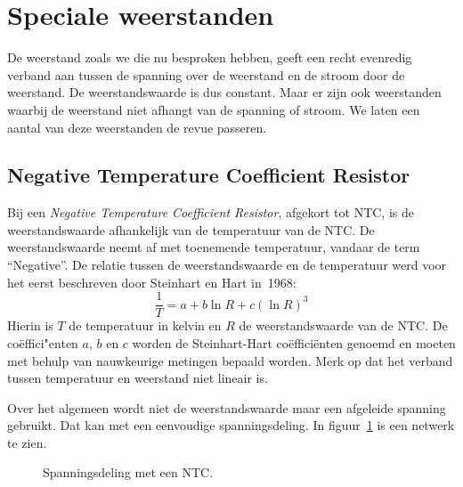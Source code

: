 \fi

\section{Speciale weerstanden}
De weerstand zoals we die nu besproken hebben, geeft een recht evenredig verband aan tussen de spanning over de weerstand en de stroom door de weerstand. De weerstandswaarde is dus constant. Maar er zijn ook weerstanden waarbij de weerstand niet afhangt van de spanning of stroom. We laten een aantal van deze weerstanden de revue passeren.

\subsection{Negative Temperature Coefficient Resistor}
Bij een \textsl{Negative Temperature Coefficient Resistor}, afgekort tot NTC, is de weerstandswaarde afhankelijk van de temperatuur van de NTC. De weerstandswaarde neemt af met toenemende temperatuur, vandaar de term ``Negative''. De relatie tussen de weerstandswaarde en de temperatuur werd voor het eerst beschreven door Steinhart en Hart in~1968:
%
\begin{equation}
\dfrac{1}{T} = a + b\ln R + c (\ln R)^3
\end{equation}
%
Hierin is $T$ de temperatuur in kelvin en $R$ de weerstandswaarde van de NTC. De co\"effici"enten $a$, $b$ en $c$ worden de Steinhart-Hart co\"effici\"enten genoemd en moeten met behulp van nauwkeurige metingen bepaald worden. Merk op dat het verband tussen temperatuur en weerstand niet lineair is.

Over het algemeen wordt niet de weerstandswaarde maar een afgeleide spanning gebruikt. Dat kan met een eenvoudige spanningsdeling. In figuur~\ref{fig:gelspanningsdelingmetntc} is een netwerk te zien.

\begin{figure}[!ht]
\centering
{}
\caption{Spanningsdeling met een NTC.}
\label{fig:gelspanningsdelingmetntc}
\end{figure}

